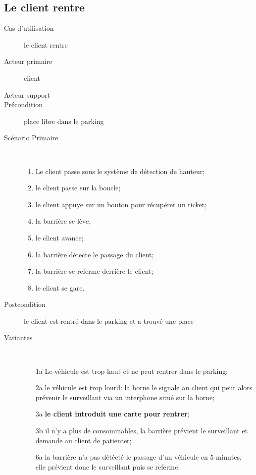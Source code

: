 \documentclass[a4paper]{article}
\begin{document}
\subsection{Le client rentre}
\begin{description}
	\item[Cas d'utilisation] le client rentre
	\item[Acteur primaire] client
	\item[Acteur support]
	\item[Pr\'econdition] place libre dans le parking
	\item[Sc\'enario Primaire] \
	\begin{enumerate}
		\item Le client passe sous le syst\`eme de d\'etection de hauteur;
		\item le client passe sur la boucle;
		\item le client appuye sur un bouton pour r\'ecup\'erer un ticket;
		\item la barri\`ere se l\`eve;
		\item le client avance;
		\item la barri\`ere d\'etecte le passage du client;
		\item la barri\`ere se referme derri\`ere le client;
		\item le client se gare.
	\end{enumerate}
	\item[Postcondition] le client est rentr\'e dans le parking et a trouv\'e une place
	\item[Variantes] \
	\begin{enumerate}
		\item[1a] Le v\'ehicule est trop haut et ne peut rentrer dans
			le parking;
		\item[2a] le v\'ehicule est trop lourd: la borne le signale au client
			qui peut alors pr\'evenir le surveillant via un interphone situ\'e
			sur la borne;
		\item[3a] \textbf{le client introduit une carte pour rentrer};
		\item[3b] il n'y a plus de consommables, la barri\`ere pr\'evient
			le surveillant et demande au client de patienter;
		\item[6a] la barri\`ere n'a pas d\'et\'ect\'e le passage d'un v\'ehicule
			en $5$ minutes, elle pr\'evient donc le surveillant puis se referme.
	\end{enumerate}
\end{description}
\end{document}
